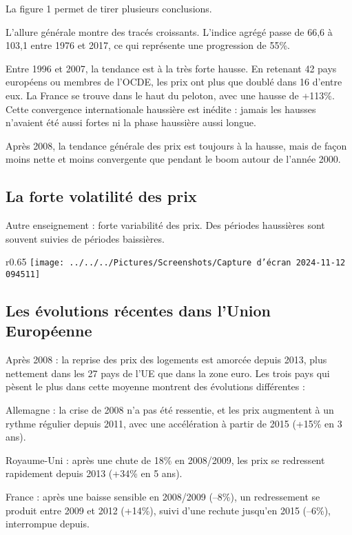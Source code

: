 \documentclass[a4paper, 12pt]{report}
\begin{document}
La figure 1 permet de tirer plusieurs conclusions.

L’allure générale montre des tracés croissants. L’indice agrégé passe de 66,6 à 103,1 entre 1976 et 2017, ce qui représente une progression de 55\%.

Entre 1996 et 2007, la tendance est à la très forte hausse. En retenant 42 pays européens ou membres de l’OCDE, les prix ont plus que doublé dans 16 d’entre eux. La France se trouve dans le haut du peloton, avec une hausse de +113\%. Cette convergence internationale haussière est inédite : jamais les hausses n’avaient été aussi fortes ni la phase haussière aussi longue.

Après 2008, la tendance générale des prix est toujours à la hausse, mais de façon moins nette et moins convergente que pendant le boom autour de l’année 2000.

\subsection{La forte volatilité des prix}

Autre enseignement : forte variabilité des prix. Des périodes haussières sont souvent suivies de périodes baissières.
\newpage
\begin{wrapfigure}{r}{0.65\textwidth}
	\centering
\texttt{[image: ../../../Pictures/Screenshots/Capture d'écran 2024-11-12 094511]}
\end{wrapfigure}

\subsection{Les évolutions récentes dans l'Union Européenne}

Après 2008 : la reprise des prix des logements est amorcée depuis 2013, plus nettement dans les 27 pays de l’UE que dans la zone euro. Les trois pays qui pèsent le plus dans cette moyenne montrent des évolutions différentes :

Allemagne : la crise de 2008 n’a pas été ressentie, et les prix augmentent à un rythme régulier depuis 2011, avec une accélération à partir de 2015 (+15\% en 3 ans).

Royaume-Uni : après une chute de 18\% en 2008/2009, les prix se redressent rapidement depuis 2013 (+34\% en 5 ans).

France : après une baisse sensible en 2008/2009 (–8\%), un redressement se produit entre 2009 et 2012 (+14\%), suivi d’une rechute jusqu’en 2015 (–6\%), interrompue depuis.
\end{document}
